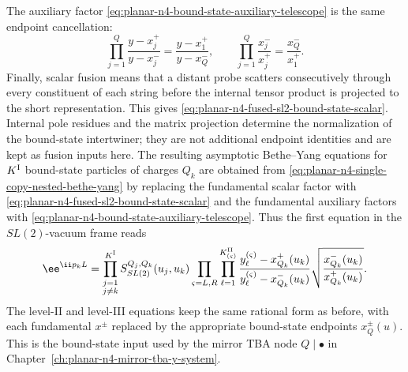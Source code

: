 The auxiliary factor
\eqref{eq:planar-n4-bound-state-auxiliary-telescope} is the same endpoint
cancellation:
\[
  \prod_{j=1}^{Q}\frac{y-x_j^+}{y-x_j^-}
  =
  \frac{y-x_1^+}{y-x_Q^-},
  \qquad
  \prod_{j=1}^{Q}\frac{x_j^-}{x_j^+}
  =
  \frac{x_Q^-}{x_1^+}.
\]
Finally, scalar fusion means that a distant probe scatters consecutively
through every constituent of each string before the internal tensor product is
projected to the short representation.  This gives
\eqref{eq:planar-n4-fused-sl2-bound-state-scalar}.  Internal pole residues
and the matrix projection determine the normalization of the bound-state
intertwiner; they are not additional endpoint identities and are kept as
fusion inputs here.
The resulting asymptotic Bethe--Yang equations for \(K^{\rm I}\) bound-state
particles of charges \(Q_k\) are obtained from
\eqref{eq:planar-n4-single-copy-nested-bethe-yang} by replacing the
fundamental scalar factor with
\eqref{eq:planar-n4-fused-sl2-bound-state-scalar} and the fundamental
auxiliary factors with
\eqref{eq:planar-n4-bound-state-auxiliary-telescope}.  Thus the first
equation in the \(SL(2)\)-vacuum frame reads
\begin{equation}
  \ee^{\ii p_kL}
  =
  \prod_{\substack{j=1\\j\neq k}}^{K^{\rm I}}
  S^{Q_j,Q_k}_{SL(2)}(u_j,u_k)
  \prod_{\varsigma=L,R}
  \prod_{\ell=1}^{K^{\rm II}_{(\varsigma)}}
  \frac{y_\ell^{(\varsigma)}-x_{Q_k}^+(u_k)}
       {y_\ell^{(\varsigma)}-x_{Q_k}^-(u_k)}
  \sqrt{\frac{x_{Q_k}^-(u_k)}{x_{Q_k}^+(u_k)}} .
  \label{eq:planar-n4-bound-state-bethe-yang}
\end{equation}
The level-II and level-III equations keep the same rational form as before,
with each fundamental \(x^\pm\) replaced by the appropriate bound-state
endpoints \(x_Q^\pm(u)\).  This is the bound-state input used by the mirror
TBA node \(Q\mid\bullet\) in
Chapter~\ref{ch:planar-n4-mirror-tba-y-system}.

